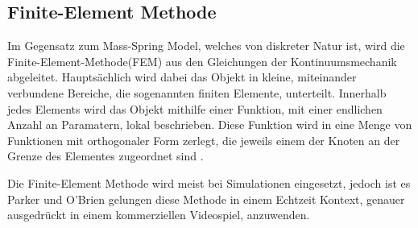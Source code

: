 \subsection{Finite-Element Methode}

Im Gegensatz zum Mass-Spring Model, welches von diskreter Natur ist, wird die Finite-Element-Methode(FEM) aus den Gleichungen der Kontinuumsmechanik abgeleitet.
Hauptsächlich wird dabei das Objekt in kleine, miteinander verbundene Bereiche, die sogenannten finiten Elemente, unterteilt. 
Innerhalb jedes Elements wird das Objekt mithilfe einer Funktion, mit einer endlichen Anzahl an Paramatern, lokal beschrieben. Diese Funktion wird in eine Menge von
Funktionen mit orthogonaler Form zerlegt, die jeweils einem der Knoten an der Grenze des Elementes zugeordnet sind \cite{OBrien.BrittleFracture}. 

Die Finite-Element Methode wird meist bei Simulationen eingesetzt, jedoch ist es Parker und O'Brien \cite{Parker.Real-TimeDeformation} gelungen
diese Methode in einem Echtzeit Kontext, genauer ausgedrückt in einem kommerziellen Videospiel, anzuwenden.
